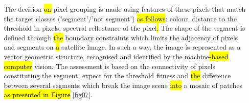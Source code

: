 \documentclass[sustainability,article,submit,pdftex,moreauthors]{Definitions/mdpi}
\begin{document}
The decision \hl{on} pixel grouping is made using features of these pixels that match the target classes ('segment'/'not segment') \hl{as follows}: colour, distance to the threshold in pixels, spectral reflectance of the pixel\hl{. }The shape of the segment is defined through \hl{the }boundary constraints which limits the adjacency of pixels and segments on \hl{a} satellite image. In such a way, the image is represented as a vector geometric structure, recognised and identified by the machine\hl{-based computer }vision. The assessment is based on the connectivity of pixels constituting the segment, expect for the threshold fitness and \hl{the }difference between several segments which break the image scene \hl{into} a mosaic of patches\hl{ as presented in Figure} \ref{fig07}.

\begin{figure}[H]
\hspace{50pt}\\
\vfill \vspace{1mm}
\hspace{50pt}\\
\vfill \vspace{1mm}
\hspace{50pt}\makebox[0.90\linewidth][r]{%
}
\end{figure}
\end{document}
